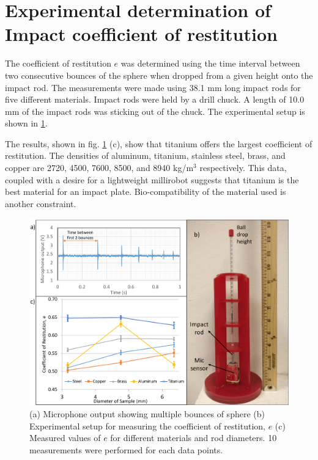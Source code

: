 \documentclass[letterpaper, 10 pt, journal, twoside]{ieeetran}
\begin{document}
\section{Experimental determination of Impact coefficient of restitution}
\label{cor_det}
The coefficient of restitution $e$ was determined using the time interval between two consecutive bounces of the sphere when dropped from a given height onto the impact rod. The measurements were made using 38.1 mm long impact rods for five different materials. Impact rods were held by a drill chuck. A length of 10.0 mm of the impact rods was sticking out of the chuck. The experimental setup is shown in \cref{CoR_setup_data}.

The results, shown in fig. \ref{CoR_setup_data} (c), show that titanium offers the largest coefficient of restitution. The densities of aluminum, titanium, stainless steel, brass, and copper are 2720, 4500, 7600, 8500, and 8940 kg/m$^3$ respectively. This data, coupled with a desire for a lightweight millirobot suggests that titanium is the best material for an impact plate. Bio-compatibility of the material used is another constraint.

\begin{figure}
	\includegraphics[width=\columnwidth]{CoR_setup_data.pdf}
	\caption{(a) Microphone output showing multiple bounces of sphere (b) Experimental setup for measuring the coefficient of restitution, $e$ (c) Measured values of $e$ for different materials and rod diameters. 10 measurements were performed for each data points.}
	\label{CoR_setup_data}
	\vspace{-1.5em}
\end{figure}
\end{document}
